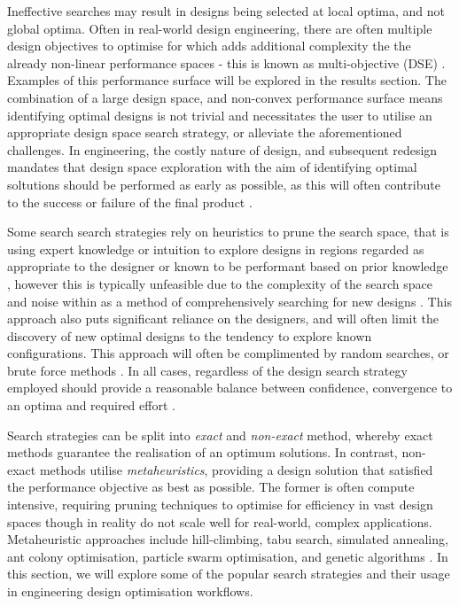 \documentclass{article}
\begin{document}
Ineffective searches may result in designs being selected at local optima, and not global optima. Often in real-world design engineering, there are often multiple design objectives to optimise for which adds additional complexity the the already non-linear performance spaces - this is known as multi-objective (DSE) \citep{Pimentel2022}.  Examples of this performance surface will be explored in the results section. The combination of a large design space, and non-convex performance surface means identifying optimal designs is not trivial and necessitates the user to utilise an appropriate design space search strategy, or alleviate the aforementioned challenges. In engineering, the costly nature of design, and subsequent redesign mandates that design space exploration with the aim of identifying optimal soltutions should be performed as early as possible, as this will often contribute to the success or failure of the final product \citep{Pimentel2022}.

Some search search strategies rely on heuristics to prune the search space, that is using expert knowledge or intuition to explore designs in regions regarded as appropriate to the designer or known to be performant based on prior knowledge \citep{Nardi2018}, however this is typically unfeasible due to the complexity of the search space and noise within as a method of comprehensively searching for new designs \citep{Zheng2023}. This approach also puts significant reliance on the designers, and will often limit the discovery of new optimal designs to the tendency to explore known configurations. This approach will often be complimented by random searches, or brute force methods \citep{Huang2022}. In all cases, regardless of the design search strategy employed should provide a reasonable balance between confidence, convergence to an optima and required effort \citep{Pimentel2022}.

Search strategies can be split into \textit{exact} and \textit{non-exact} method, whereby exact methods guarantee the realisation of an optimum solutions. In contrast, non-exact methods utilise \textit{metaheuristics}, providing a design solution that satisfied the performance objective as best as possible. The former is often compute intensive, requiring pruning techniques to optimise for efficiency in vast design spaces though in reality do not scale well for real-world, complex applications. Metaheuristic approaches include hill-climbing, tabu search, simulated annealing, ant colony optimisation, particle swarm optimisation, and genetic algorithms \citep{Panerati2016}. In this section, we will explore some of the popular search strategies and their usage in engineering design optimisation workflows.
\end{document}
